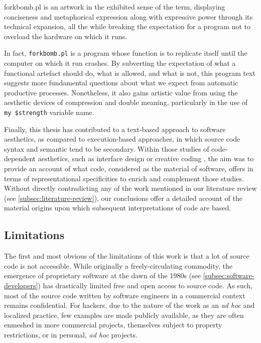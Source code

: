 \begin{listing}
    \inputminted{perl}{./corpus/forkbomb.pl}
    \caption{forkbomb.pl is an artwork in the exhibited sense of the term, displaying conciseness and metaphorical expression along with expressive power through its technical expansion, all the while breaking the expectation for a program not to overload the hardware on which it runs.}
    \label{code:forkbomb}
\end{listing}

In fact, \lstinline{forkbomb.pl} is a program whose function is to replicate itself until the computer on which it run crashes. By subverting the expectation of what a functional artefact should do, what is allowed, and what is not, this program text suggests more fundamental questions about what we expect from automatic productive processes. Nonetheless, it also gains artistic value from using the aesthetic devices of compression and double meaning, particularly in the use of \lstinline{my $strength} variable name.

Finally, this thesis has contributed to a text-based approach to software aesthetics, as compared to execution-based approaches, in which source code syntax and semantic tend to be secondary. Within those studies of code-dependent aesthetics, such as interface design \citep{fishwick_aesthetic_2002} or creative coding \citep{cox_aesthetic_2020}, the aim was to provide an account of what code, considered as the material of software, offers in terms of representational specificities to enrich and complement those studies. Without directly contradicting any of the work mentioned in our literature review (see \ref{subsec:literature-review}), our conclusions offer a detailed account of the material origins upon which subsequent interpretations of code are based.

\subsection{Limitations}
\label{subsec:conclusion-limitations}

The first and most obvious of the limitations of this work is that a lot of source code is not accessible. While originally a freely-circulating commodity, the emergence of proprietary software at the dawn of the 1980s (see \ref{subsec:software-developers}) has drastically limited free and open access to source code. As such, most of the source code written by software engineers in a commercial context remains confidential. For hackers, due to the nature of the work as an \emph{ad hoc} and localized practice, few examples are made publicly available, as they are often enmeshed in more commercial projects, themselves subject to property restrictions, or in personal, \emph{ad hoc} projects.

